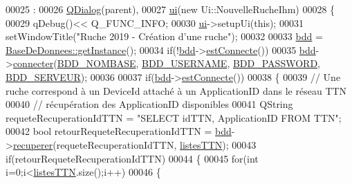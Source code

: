 \begin{DoxyCode}
00025                                                   :
00026     \hyperlink{class_q_dialog}{QDialog}(parent),
00027     \hyperlink{class_nouvelle_ruche_ihm_a46c1f0446fc75c67847d152d89d75960}{ui}(\textcolor{keyword}{new} Ui::NouvelleRucheIhm)
00028 \{
00029     qDebug()<< Q\_FUNC\_INFO;
00030     \hyperlink{class_nouvelle_ruche_ihm_a46c1f0446fc75c67847d152d89d75960}{ui}->setupUi(\textcolor{keyword}{this});
00031     setWindowTitle(\textcolor{stringliteral}{"Ruche 2019 - Création d'une ruche"});
00032 
00033     \hyperlink{class_nouvelle_ruche_ihm_af552d9e6944c266060860d911878cff7}{bdd} = \hyperlink{class_base_de_donnees_a80028aa2b6b4fbf30fb2e36357b7d3d3}{BaseDeDonnees::getInstance}();
00034     \textcolor{keywordflow}{if}(!\hyperlink{class_nouvelle_ruche_ihm_af552d9e6944c266060860d911878cff7}{bdd}->\hyperlink{class_base_de_donnees_a00388973f3ec42e5c8e76e7af7e124b2}{estConnecte}())
00035         \hyperlink{class_nouvelle_ruche_ihm_af552d9e6944c266060860d911878cff7}{bdd}->\hyperlink{class_base_de_donnees_ac20da193923a9bfea5e38ee5a54820cd}{connecter}(\hyperlink{parametres_8h_a45f8f15b8f9a7ab4c2b219038ff64f6b}{BDD\_NOMBASE}, \hyperlink{parametres_8h_a88b5f5b81fa534553c68802384beff2c}{BDD\_USERNAME}, 
      \hyperlink{parametres_8h_ae2ded9166ed2553182545e97514c04f7}{BDD\_PASSWORD}, \hyperlink{parametres_8h_a423559dc987673b8aacaa9f369839bb0}{BDD\_SERVEUR});
00036 
00037     \textcolor{keywordflow}{if}(\hyperlink{class_nouvelle_ruche_ihm_af552d9e6944c266060860d911878cff7}{bdd}->\hyperlink{class_base_de_donnees_a00388973f3ec42e5c8e76e7af7e124b2}{estConnecte}())
00038     \{
00039         \textcolor{comment}{// Une ruche correspond à un DeviceId attaché à un ApplicationID dans le réseau TTN}
00040         \textcolor{comment}{// récupération des ApplicationID disponibles}
00041         QString requeteRecuperationIdTTN = \textcolor{stringliteral}{"SELECT idTTN, ApplicationID FROM TTN"};
00042         \textcolor{keywordtype}{bool} retourRequeteRecuperationIdTTN = \hyperlink{class_nouvelle_ruche_ihm_af552d9e6944c266060860d911878cff7}{bdd}->\hyperlink{class_base_de_donnees_a77539baad389f5acf754cd2cd452403e}{recuperer}(requeteRecuperationIdTTN, 
      \hyperlink{class_nouvelle_ruche_ihm_a0c97db3419bafe928aabed3aa01d46fb}{listesTTN});
00043         \textcolor{keywordflow}{if}(retourRequeteRecuperationIdTTN)
00044         \{
00045             \textcolor{keywordflow}{for}(\textcolor{keywordtype}{int} i=0;i<\hyperlink{class_nouvelle_ruche_ihm_a0c97db3419bafe928aabed3aa01d46fb}{listesTTN}.size();i++)
00046             \{

\end{DoxyCode}
